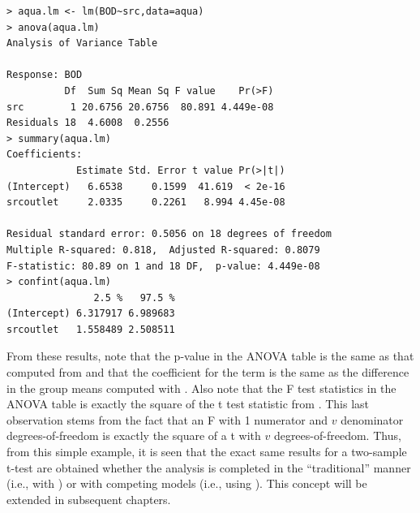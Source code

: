 \documentclass[10pt,openany]{book}\usepackage[]{graphicx}\usepackage[]{color}
\makeatletter
\newenvironment{kframe}{%
 \def\at@end@of@kframe{}%
 \ifinner\ifhmode%
  \def\at@end@of@kframe{\end{minipage}}%
  \begin{minipage}{\columnwidth}%
 \fi\fi%
 \def\FrameCommand##1{\hskip\@totalleftmargin \hskip-\fboxsep
 \colorbox{shadecolor}{##1}\hskip-\fboxsep
     \hskip-\linewidth \hskip-\@totalleftmargin \hskip\columnwidth}%
 \MakeFramed {\advance\hsize-\width
   \@totalleftmargin\z@ \linewidth\hsize
   \@setminipage}}%
 {\par\unskip\endMakeFramed%
 \at@end@of@kframe}
\newenvironment{knitrout}{}{} %
\makeatother
\begin{document}
\begin{knitrout}
\color{fgcolor}\begin{kframe}
\begin{verbatim}
> aqua.lm <- lm(BOD~src,data=aqua)
> anova(aqua.lm)
Analysis of Variance Table

Response: BOD
          Df  Sum Sq Mean Sq F value    Pr(>F)
src        1 20.6756 20.6756  80.891 4.449e-08
Residuals 18  4.6008  0.2556                  
> summary(aqua.lm)
Coefficients:
            Estimate Std. Error t value Pr(>|t|)
(Intercept)   6.6538     0.1599  41.619  < 2e-16
srcoutlet     2.0335     0.2261   8.994 4.45e-08

Residual standard error: 0.5056 on 18 degrees of freedom
Multiple R-squared: 0.818,	Adjusted R-squared: 0.8079 
F-statistic: 80.89 on 1 and 18 DF,  p-value: 4.449e-08 
> confint(aqua.lm)
               2.5 %   97.5 %
(Intercept) 6.317917 6.989683
srcoutlet   1.558489 2.508511
\end{verbatim}
\end{kframe}
\end{knitrout}

From these results, note that the p-value in the ANOVA table is the same as that computed from  and that the coefficient for the  term is the same as the difference in the group means computed with .  Also note that the F test statistics in the ANOVA table is exactly the square of the t test statistic from .  This last observation stems from the fact that an F with 1 numerator and $v$ denominator degrees-of-freedom is exactly the square of a t with $v$ degrees-of-freedom.  Thus, from this simple example, it is seen that the exact same results for a two-sample t-test are obtained whether the analysis is completed in the ``traditional'' manner (i.e., with ) or with competing models (i.e., using ).  This concept will be extended in subsequent chapters.
\end{document}

